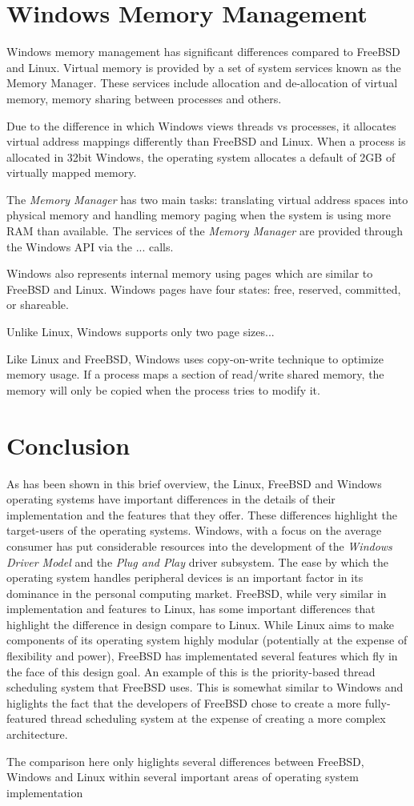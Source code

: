 \documentclass[onecolumn,10pt]{IEEETran}
\begin{document}
\section{Windows Memory Management}

Windows memory management has significant differences compared to FreeBSD and Linux.  Virtual memory is provided by a set of system services known as the Memory Manager.  These services include allocation and de-allocation of virtual memory, memory sharing between processes and others.

Due to the difference in which Windows views threads vs processes, it allocates virtual address mappings differently than FreeBSD and Linux.  When a process is allocated in 32bit Windows, the operating system allocates a default of 2GB of virtually mapped memory.

The \textit{Memory Manager} has two main tasks: translating virtual address spaces into physical memory and handling memory paging when the system is using more RAM than available.  The services of the \textit{Memory Manager} are provided through the Windows API via the  ... calls.

Windows also represents internal memory using pages which are similar to FreeBSD and Linux.  Windows pages have four states: free, reserved, committed, or shareable.

Unlike Linux, Windows supports only two page sizes...

Like Linux and FreeBSD, Windows uses copy-on-write technique to optimize memory usage.  If a process maps a section of read/write shared memory, the memory will only be copied when the process tries to modify it.

\section{Conclusion}

As has been shown in this brief overview, the Linux, FreeBSD and Windows operating systems have important differences in the details of their implementation and the features that they offer.  These differences highlight the target-users of the operating systems.  Windows, with a focus on the average consumer has put considerable resources into the development of the \textit{Windows Driver Model} and the \textit{Plug and Play} driver subsystem.  The ease by which the operating system handles peripheral devices is an important factor in its dominance in the personal computing market.  FreeBSD, while very similar in implementation and features to Linux, has some important differences that highlight the difference in design compare to Linux.  While Linux aims to make components of its operating system highly modular (potentially at the expense of flexibility and power), FreeBSD has implementated several features which fly in the face of this design goal.  An example of this is the priority-based thread scheduling system that FreeBSD uses.  This is somewhat similar to Windows and higlights the fact that the developers of FreeBSD chose to create a more fully-featured thread scheduling system at the expense of creating a more complex architecture.

The comparison here only higlights  several differences between FreeBSD, Windows and Linux within several important areas of operating system implementation
\end{document}
